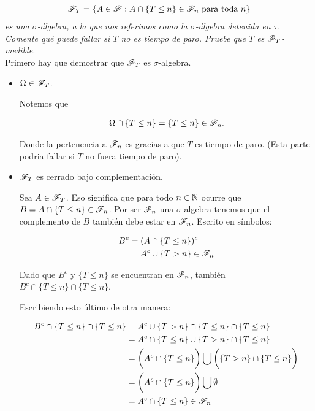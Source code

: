 \emph{
	\begin{align}
		\mathscr{F}_T=\left\{ A\in\mathscr{F}:A\cap\left\{ T\leq n\right\} \in\mathscr{F}_n\text{ para toda } n\right\} 
	\end{align}
	es una $\sigma$-\'algebra, 
	a la que nos referimos como la $\sigma$-\'algebra detenida en $\tau$. Comente qu\'e puede fallar si $T$ no es tiempo de paro. 
	Pruebe que $T$ es $\mathscr{F}_T$-medible.\\		
}			
\afterstatement		
	Primero hay que demostrar que $\mathscr{F}_T$ es $\sigma$-algebra.\pn
	
	\begin{itemize}
		\item $\Omega \in \mathscr{F}_T$.\pn
		
			Notemos que 
            
			\begin{align}
				\Omega \cap \{T \leq n\} = \{T \leq n\} \in \mathscr{F}_n.
			\end{align}\pn
            
			Donde la pertenencia a $\mathscr{F}_n$ es gracias a que $T$ es tiempo de paro. (Esta parte podria fallar si 
			$T$ no fuera tiempo de paro).\pn
		
		\item $\mathscr{F}_T$ es cerrado bajo complementación.\pn
		
			Sea $A \in \mathscr{F}_T$. Eso significa que para todo $n \in  \mathbb{N}$ ocurre que $B = A \cap \{ T \leq n \} \in \mathscr{F}_n$. 
			Por ser $\mathscr{F}_n$ una $\sigma$-algebra tenemos que el complemento de $B$ también debe estar en $\mathscr{F}_n$. 
			Escrito en símbolos:
			
			\begin{align}
				B^c 	&= (A   \cap \{ T \leq n \})^c      \\
						&=  A^c \cup \{ T > n \} \in \mathscr{F}_n
			\end{align}
			
			Dado que $B^c$ y $\{ T \leq n \}$ se encuentran en $\mathscr{F}_n$, también \\
			$B^c \cap \{ T \leq n \} \cap \{ T \leq n \}$.\pn
			
			Escribiendo esto último de otra manera:
            
			\begin{align}
				B^c \cap \{ T \leq n \} \cap \{ T \leq n \} 	&=		A^c \cup \{ T > n \} \cap \{ T \leq n \} \cap \{ T \leq n \} \\
																&= 		A^c \cap \{ T \leq n \} \cup \{ T > n \} \cap \{ T \leq n \} \\
																&= 		\bigg(A^c \cap \{ T \leq n \}\bigg) 
																			\bigcup 
																		\bigg(\{ T > n \} \cap \{ T \leq n \}\bigg) \\
																&=		\bigg(A^c \cap \{ T \leq n \}\bigg)	\bigcup \emptyset \\
																&=		A^c \cap \{ T \leq n \} \in \mathscr{F}_n
			\end{align}
			

\end{itemize}
